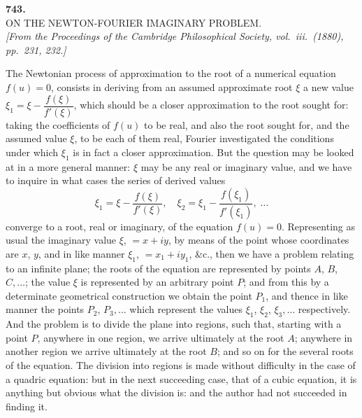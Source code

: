 \documentclass[11pt]{article}
\begin{document}
\begin{center}
\textbf{743.}\\[6pt]
\textsc{ON THE NEWTON-FOURIER IMAGINARY PROBLEM.}\\[6pt]
\textit{[From the Proceedings of the Cambridge Philosophical Society, vol.\ iii.\ (1880),\\
pp.\ 231, 232.]}
\end{center}

\bigskip

The Newtonian process of approximation to the root of a numerical equation
$f(u) = 0$, consists in deriving from an assumed approximate root $\xi$ a new value
$\xi_1 = \xi - \dfrac{f(\xi)}{f'(\xi)}$, which should be a closer approximation to the root sought for: taking
the coefficients of $f(u)$ to be real, and also the root sought for, and the assumed
value $\xi$, to be each of them real, Fourier investigated the conditions under which
$\xi_1$ is in fact a closer approximation. But the question may be looked at in a more
general manner: $\xi$ may be any real or imaginary value, and we have to inquire in
what cases the series of derived values
\[
   \xi_1 = \xi - \frac{f(\xi)}{f'(\xi)},\quad \xi_2 = \xi_1 - \frac{f(\xi_1)}{f'(\xi_1)},\;\ldots
\]
converge to a root, real or imaginary, of the equation $f(u) = 0$. Representing as usual
the imaginary value $\xi$, $= x + iy$, by means of the point whose coordinates are $x$, $y$,
and in like manner $\xi_1$, $= x_1 + iy_1$, \&c., then we have a problem relating to an infinite
plane; the roots of the equation are represented by points $A$, $B$, $C,\ldots$; the value
$\xi$ is represented by an arbitrary point $P$; and from this by a determinate geometrical
construction we obtain the point $P_1$, and thence in like manner the points $P_2$, $P_3,\ldots$
which represent the values $\xi_1$, $\xi_2$, $\xi_3,\ldots$ respectively. And the problem is to divide
the plane into regions, such that, starting with a point $P$, anywhere in one region,
we arrive ultimately at the root $A$; anywhere in another region we arrive ultimately
at the root $B$; and so on for the several roots of the equation. The division into
regions is made without difficulty in the case of a quadric equation: but in the next
succeeding case, that of a cubic equation, it is anything but obvious what the division
is: and the author had not succeeded in finding it.
\end{document}
